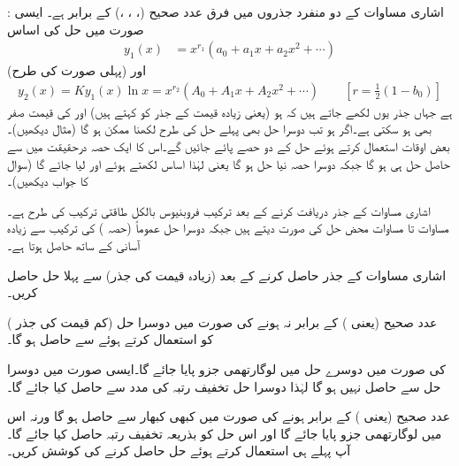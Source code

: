 : اشاری مساوات کے دو  منفرد جذروں میں فرق عدد صحیح (، ، ،) کے برابر ہے۔ ایسی صورت میں حل کی اساس
\begin{align}\label{مساوات_طاقتی_فروبنیوس_حل_ٹ}
y_1(x)&=x^{r_1}(a_0+a_1x+a_2x^2+\cdots)
\end{align}
(پہلی صورت کی طرح) اور
\begin{align}\label{مساوات_طاقتی_فروبنیوس_حل_ث}
y_2(x)=Ky_1(x)\ln x=x^{r_2}(A_0+A_1x+A_2x^2+\cdots) \quad \quad [r=\frac{1}{2}(1-b_0)]
\end{align}
ہے جہاں جذر یوں لکھے جاتے ہیں کہ  ہو (یعنی زیادہ قیمت کے جذر کو  کہتے ہیں) اور  کی قیمت صفر بھی ہو سکتی ہے۔اگر  ہو تب دوسرا حل بھی پہلے حل کی طرح  لکھنا ممکن ہو گا (مثال  دیکھیں)۔ بعض اوقات  استعمال کرتے ہوئے  حل  کے دو حصے پائے جائیں گے۔اس کا ایک حصہ درحقیقت میں  سے حاصل حل  ہی ہو گا جبکہ دوسرا حصہ نیا حل ہو گا یعنی  لہٰذا اساس لکھتے ہوئے  اور  لیا جائے گا (سوال  کا جواب دیکھیں)۔

اشاری مساوات  کے جذر دریافت کرنے کے بعد ترکیب فروبنیوس بالکل طاقتی ترکیب کی طرح ہے۔ مساوات  تا مساوات  محض حل کی صورت دیتے ہیں جبکہ دوسرا حل عموماً  (حصہ ) کی ترکیب سے زیادہ آسانی کے ساتھ حاصل ہوتا ہے۔

اشاری مساوات کے جذر حاصل کرنے کے بعد (زیادہ قیمت کی جذر)  سے  پہلا حل  حاصل کریں۔

 عدد صحیح (یعنی ) کے برابر نہ ہونے کی صورت میں دوسرا حل (کم قیمت کی جذر )  کو استعمال کرتے ہوئے  سے حاصل ہو گا۔

 کی صورت میں دوسرے حل میں لوگارتھمی جزو پایا جائے گا۔ایسی صورت میں دوسرا حل  سے حاصل نہیں ہو گا لہٰذا دوسرا حل تخفیف رتبہ کی مدد سے حاصل کیا جائے گا۔

  عدد صحیح (یعنی ) کے برابر ہونے کی صورت میں کبھی کبھار  سے حاصل ہو گا ورنہ اس میں لوگارتھمی جزو پایا جائے گا اور اس حل کو بذریعہ تخفیف رتبہ حاصل کیا جائے گا۔آپ پہلے   ہی استعمال کرتے ہوئے حل حاصل کرنے کی کوشش کریں۔


